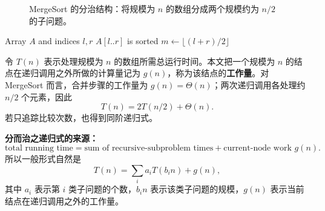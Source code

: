 \documentclass[11pt,a4paper]{article}
\begin{document}
\begin{figure}[H]
\centering
{}
\caption{MergeSort 的分治结构：将规模为 $n$ 的数组分成两个规模约为 $n/2$ 的子问题。}
\label{fig:mergesort-split}
\end{figure}

\begin{algorithm}[H]
\caption{{\sc MergeSort}$(A,l,r)$}
\label{alg:mergesort}
\begin{algorithmic}[1]
\Require Array $A$ and indices $l,r$
\Ensure $A[l..r]$ is sorted
  \State $m\gets \lfloor(l+r)/2\rfloor$
  \State {}
  \State {}
  \State {} 
\EndIf
\end{algorithmic}
\end{algorithm}

令 $T(n)$ 表示处理规模为 $n$ 的数组所需总运行时间。本文把一个规模为 $n$ 的结点在递归调用之外所做的计算量记为 $g(n)$，称为该结点的\textbf{工作量}。对 MergeSort 而言，合并步骤的工作量为 $g(n)=\Theta(n)$；两次递归调用各处理约 $n/2$ 个元素，因此
\begin{equation}
T(n)=2T(n/2)+\Theta(n).
\end{equation}
若只追踪比较次数，也得到同阶递归式。

\begin{tcolorbox}
\textbf{分而治之递归式的来源：}
\[
\text{total running time}
=\text{sum of recursive-subproblem times}+\text{current-node work }g(n).
\]
所以一般形式自然是
\[
T(n)=\sum_i a_i T(b_i n)+g(n),
\]
其中 $a_i$ 表示第 $i$ 类子问题的个数，$b_i n$ 表示该类子问题的规模，$g(n)$ 表示当前结点在递归调用之外的工作量。
\end{tcolorbox}
\end{document}
